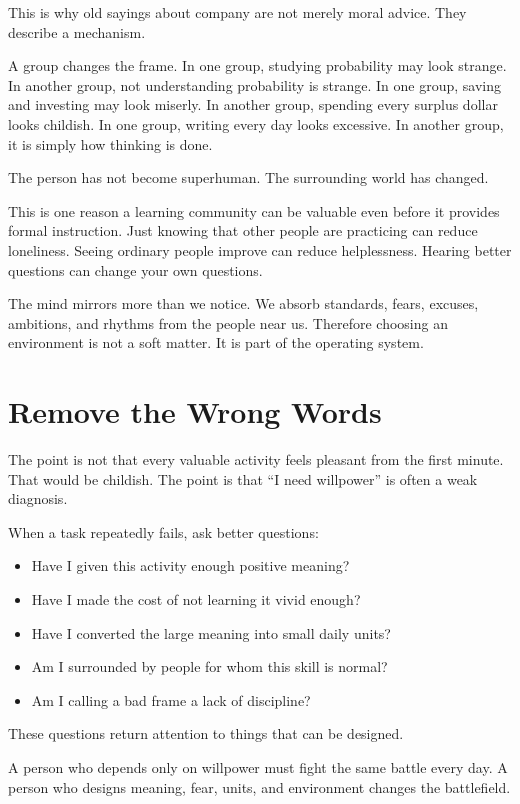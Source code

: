This is why old sayings about company are not merely moral advice. They describe a mechanism.

A group changes the frame. In one group, studying probability may look strange. In another group, not understanding probability is strange. In one group, saving and investing may look miserly. In another group, spending every surplus dollar looks childish. In one group, writing every day looks excessive. In another group, it is simply how thinking is done.

The person has not become superhuman. The surrounding world has changed.

This is one reason a learning community can be valuable even before it provides formal instruction. Just knowing that other people are practicing can reduce loneliness. Seeing ordinary people improve can reduce helplessness. Hearing better questions can change your own questions.

The mind mirrors more than we notice. We absorb standards, fears, excuses, ambitions, and rhythms from the people near us. Therefore choosing an environment is not a soft matter. It is part of the operating system.

\section*{Remove the Wrong Words}

The point is not that every valuable activity feels pleasant from the first minute. That would be childish. The point is that ``I need willpower'' is often a weak diagnosis.

When a task repeatedly fails, ask better questions:

\begin{itemize}
\item Have I given this activity enough positive meaning?
\item Have I made the cost of not learning it vivid enough?
\item Have I converted the large meaning into small daily units?
\item Am I surrounded by people for whom this skill is normal?
\item Am I calling a bad frame a lack of discipline?
\end{itemize}

These questions return attention to things that can be designed.

A person who depends only on willpower must fight the same battle every day. A person who designs meaning, fear, units, and environment changes the battlefield.

